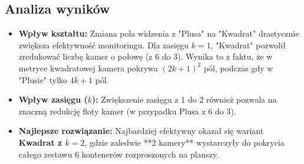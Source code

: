 \documentclass[11pt, a4paper]{article}
\begin{document}
\subsection{Analiza wyników}
\begin{itemize}
    \item \textbf{Wpływ kształtu:} Zmiana pola widzenia z "Plusa" na "Kwadrat" drastycznie zwiększa efektywność monitoringu. Dla zasięgu $k=1$, "Kwadrat" pozwolił zredukować liczbę kamer o połowę (z 6 do 3). Wynika to z faktu, że w metryce kwadratowej kamera pokrywa $(2k+1)^2$ pól, podczas gdy w "Plusie" tylko $4k+1$ pól.
    
    \item \textbf{Wpływ zasięgu ($k$):} Zwiększenie zasięgu z 1 do 2 również pozwala na znaczną redukcję floty kamer (w przypadku Plusa z 6 do 3).
    
    \item \textbf{Najlepsze rozwiązanie:} Najbardziej efektywny okazał się wariant \textbf{Kwadrat z $k=2$}, gdzie zaledwie **2 kamery** wystarczyły do pokrycia całego zestawu 6 kontenerów rozproszonych na planszy.
\end{itemize}

\end{document}
